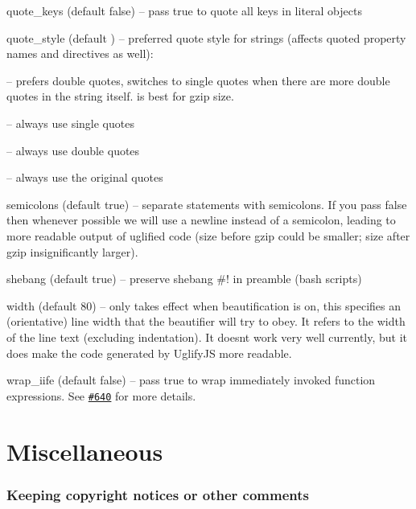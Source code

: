 \begin{DoxyItemize}
\item {\ttfamily quote\+\_\+keys} (default {\ttfamily false}) -- pass {\ttfamily true} to quote all keys in literal objects
\item {\ttfamily quote\+\_\+style} (default {}) -- preferred quote style for strings (affects quoted property names and directives as well)\+:
\begin{DoxyItemize}
\item {} -- prefers double quotes, switches to single quotes when there are more double quotes in the string itself. {} is best for gzip size.
\item {} -- always use single quotes
\item {} -- always use double quotes
\item {} -- always use the original quotes
\end{DoxyItemize}
\item {\ttfamily semicolons} (default {\ttfamily true}) -- separate statements with semicolons. If you pass {\ttfamily false} then whenever possible we will use a newline instead of a semicolon, leading to more readable output of uglified code (size before gzip could be smaller; size after gzip insignificantly larger).
\item {\ttfamily shebang} (default {\ttfamily true}) -- preserve shebang {\ttfamily \#!} in preamble (bash scripts)
\item {\ttfamily width} (default 80) -- only takes effect when beautification is on, this specifies an (orientative) line width that the beautifier will try to obey. It refers to the width of the line text (excluding indentation). It doesn\textquotesingle{}t work very well currently, but it does make the code generated by Uglify\+JS more readable.
\item {\ttfamily wrap\+\_\+iife} (default {\ttfamily false}) -- pass {\ttfamily true} to wrap immediately invoked function expressions. See \href{https://github.com/mishoo/UglifyJS2/issues/640}{\tt \#640} for more details.
\end{DoxyItemize}

\section*{Miscellaneous}

\subsubsection*{Keeping copyright notices or other comments}

